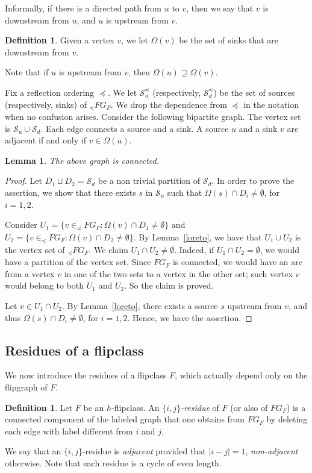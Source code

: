 \documentclass[12pt,reqno]{amsart}
\theoremstyle{plain}
\newtheorem{lem}[thm]{Lemma}
\theoremstyle{definition}
\newtheorem{defn}[thm]{Definition}
\theoremstyle{remark}
\begin{document}
Informally, if there is a directed path from $u$ to $v$, then we say that $v$ is downstream from $u$, and $u$ is upstream from $v$. 

\begin{defn}
\label{omig}
Given a vertex $v$, we let $\Omega(v)$ be the set of sinks that are downstream from $v$. 
\end{defn}
Note that if $u$ is upstream from $v$, then $\Omega(u)\supseteq \Omega(v)$.



Fix a reflection ordering $\preceq$.  We let $\mathcal S^{\preceq}_{u}$ (respectively, $\mathcal S^{\preceq}_{d}$) be the set of sources (respectively, sinks) of $_{\preceq} FG_F$. We drop the dependence from $\preceq$ in the notation when no confusion arises. Consider the following bipartite graph. The vertex set is $\mathcal S_{u} \cup \mathcal S_{d}$. Each  edge connects a source and a sink. A source $u$ and a sink $v$ are adjacent  if and only if $v\in \Omega(u)$.
\begin{lem}
\label{bipartito-connesso}
The above graph is connected. 
\end{lem}
\begin{proof}
Let $D_1 \sqcup D_2= \mathcal S_{d}$ be a non trivial partition of $ \mathcal S_{d}$. In order to prove the assertion, we show that there exists $s$ in $\mathcal S_{u}$ such that $\Omega(s)\cap D_i\neq \emptyset$, for $i=1,2$. 

Consider $U_1= \{v \in  _{\preceq} FG_F: \Omega(v) \cap D_1 \neq \emptyset\}$ and   $U_2=\{v \in  _{\preceq} FG_F: \Omega(v) \cap D_2 \neq \emptyset\}$. By Lemma~\ref{loreto}, we have that $U_1 \cup U_2$ is the vertex set of $_{\preceq} FG_F $. 
We claim $U_1 \cap U_2 \neq \emptyset$. Indeed, if $U_1 \cap U_2 = \emptyset$, we would have a partition of the vertex set. 
Since $ FG_F$ is connected, we would have an arc from a vertex $v$ in one of the two sets to a vertex in the other set; such vertex $v$ would belong to both $U_1$ and $U_2$. So the claim is proved.

Let $v\in U_1 \cap U_2$. By Lemma~\ref{loreto}, there exists a source $s$ upstream from $v$, and thus  $\Omega(s)\cap D_i\neq \emptyset$, for $i=1,2$. Hence, we have the assertion. 
\end{proof}


\subsection{Residues of a flipclass}
We now introduce the residues of a flipclass $F$, which actually depend only on the flipgraph of $F$.
\begin{defn}
Let $F$ be an $h$-flipclass. An \emph{$\{i,j\}$-residue} of  $F$ (or also of $FG_F$) is a connected component of the labeled graph that one obtains from $FG_F$ by deleting each edge with label different from $i$ and $j$.
\end{defn}
We say that an $\{i,j\}$-residue is \emph{adjacent} provided that $|i - j| = 1$, \emph{non-adjacent} otherwise. Note that each residue is a cycle of even length. 
\end{document}
